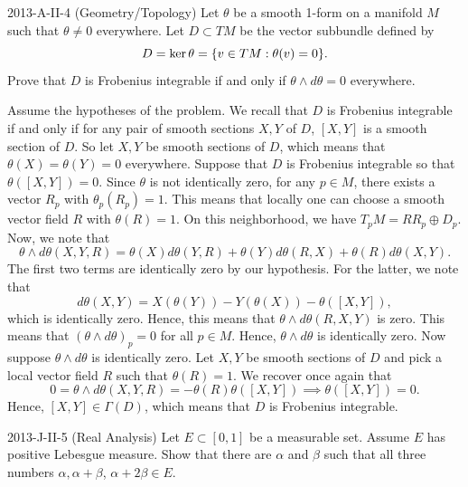 \documentclass{article}
\begin{document}
\begin{prb}{2013-A-II-4 (Geometry/Topology)}
	Let $\theta$ be a smooth 1-form on a manifold $M$ such that $\theta \neq 0$ everywhere. Let $D \subset TM$ be the vector subbundle defined by 
		\begin{equation*}
			D = \ker{\theta} = \brac*{v \in TM: \theta(v) =0}. 
		\end{equation*}
	Prove that $D$ is Frobenius integrable if and only if $\theta \wedge d\theta = 0$ everywhere. 
\end{prb}
\begin{solutions}
	Assume the hypotheses of the problem. We recall that $D$ is Frobenius integrable if and only if for any pair of smooth sections $X, Y$ of $D$, $[X, Y]$ is a smooth section of $D$. So let $X, Y$ be smooth sections of $D$, which means that $\theta(X) = \theta(Y) = 0$ everywhere. Suppose that $D$ is Frobenius integrable so that $\theta([X, Y]) = 0$. Since $\theta$ is not identically zero, for any $p \in M$, there exists a vector $R_{p}$ with $\theta_{p}(R_{p}) = 1$. This means that locally one can choose a smooth vector field $R$ with $\theta(R) = 1$. On this neighborhood, we have $T_{p}M= RR_{p} \oplus D_{p}$. Now, we note that 
		\begin{equation}
			\theta \wedge d\theta(X, Y, R) = \theta(X)d\theta(Y,R) + \theta(Y)d\theta(R,X) + \theta(R)d\theta(X, Y). 
		\end{equation}
	The first two terms are identically zero by our hypothesis. For the latter, we note that
		\begin{equation}
			d\theta(X, Y) = X(\theta(Y)) - Y(\theta(X)) - \theta([X, Y]), 
		\end{equation}
	which is identically zero. Hence, this means that $\theta \wedge d\theta(R, X, Y)$ is zero. This means that $(\theta \wedge d\theta)_{p} = 0$ for all $p \in M$. Hence, $\theta \wedge d\theta$ is identically zero. Now suppose $\theta \wedge d\theta$ is identically zero. Let $X, Y$ be smooth sections of $D$ and pick a local vector field $R$ such that $\theta(R) = 1$. We recover once again that 
		\begin{equation}
			0 = \theta \wedge d\theta(X, Y, R) = -\theta(R)\theta([X,Y]) \implies \theta([X, Y]) = 0. 
		\end{equation}
	Hence, $[X, Y] \in \Gamma(D)$, which means that $D$ is Frobenius integrable. 
\end{solutions}
\begin{prb}{2013-J-II-5 (Real Analysis)}
	Let $E \subset [0,1]$ be a measurable set. Assume $E$ has positive Lebesgue measure. Show that there are $\alpha$ and $\beta$ such that all three numbers $\alpha, \alpha + \beta$, $\alpha + 2\beta \in E$. 
\end{prb}
\end{document}
